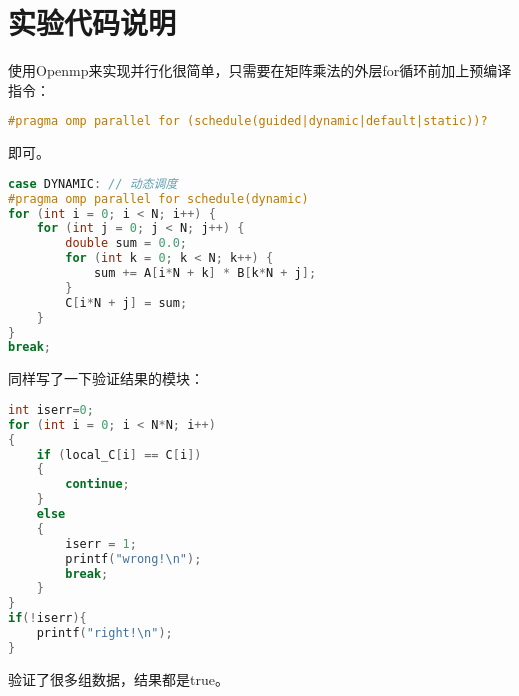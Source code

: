 \documentclass{SYSUReport}
\begin{document}
\section{实验代码说明}
使用Openmp来实现并行化很简单，只需要在矩阵乘法的外层for循环前加上预编译指令：
\begin{lstlisting}[language=c]
#pragma omp parallel for (schedule(guided|dynamic|default|static))?
\end{lstlisting}
即可。
\begin{lstlisting}[language=c]
case DYNAMIC: // 动态调度
#pragma omp parallel for schedule(dynamic)
for (int i = 0; i < N; i++) {
    for (int j = 0; j < N; j++) {
        double sum = 0.0;
        for (int k = 0; k < N; k++) {
            sum += A[i*N + k] * B[k*N + j];
        }
        C[i*N + j] = sum;
    }
}
break;    
\end{lstlisting}
同样写了一下验证结果的模块：
\begin{lstlisting}[language=c]
int iserr=0;
for (int i = 0; i < N*N; i++)
{
    if (local_C[i] == C[i])
    {
        continue;
    }
    else
    {
        iserr = 1;
        printf("wrong!\n");
        break;
    }
}
if(!iserr){
    printf("right!\n");
}
\end{lstlisting}
验证了很多组数据，结果都是true。
\end{document}
